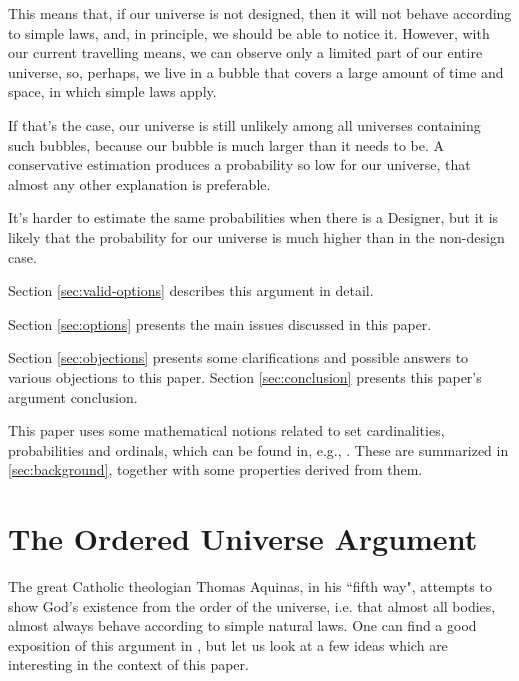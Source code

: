 \documentclass[a4paper
]{article}
\newcommand{\svn}[2][]{\todo[author=Virgil,color=red!25!white,#1]{#2}}
\newcommand{\paper}[1]{paper}
\newcommand{\ghilimele}[1]{``#1"}
\begin{document}
This means that, if our universe is not designed, then it will not behave
according to simple laws, and, in principle, we should be able to notice it.
However, with our current travelling means, we can observe only a limited
part of our entire universe, so, perhaps, we live in a bubble that covers
a large amount of time and space, in which simple laws apply.

If that's the case, our universe is still unlikely among all universes
containing such bubbles, because our bubble is much larger than it needs to
be.
A conservative estimation produces a probability so low for our universe,
that almost any other explanation is preferable.

It's harder to estimate the same probabilities when there is a Designer, but
it is likely that the probability for our universe is much higher than in the
non-design case.

Section \ref{sec:valid-options} describes this argument in detail.

Section \ref{sec:options} presents
the main issues discussed in this paper.

Section \ref{sec:objections} presents some clarifications and possible
answers to various objections to this paper.
Section \ref{sec:conclusion} presents this \paper{}'s argument conclusion.

This \paper{} uses some mathematical notions related to set cardinalities,
probabilities and ordinals, which can be found in, e.g., \svn{quote}.
These are summarized in \ref{sec:background}, together with some properties
derived from them.

\section{The Ordered Universe Argument}
\label{sec:ordered-universe}

The great Catholic theologian Thomas Aquinas,
in his \ghilimele{fifth way}, attempts to show God's existence from
the order of the universe, i.e. that almost all bodies, almost always
behave according to simple natural laws.
One can find a good exposition of this argument in
\parencite{swinburne1968}, but let us look at a few ideas which are
interesting in the context of this \paper{}.
\end{document}
